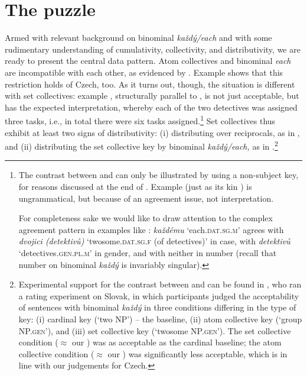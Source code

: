 \documentclass[output=paper,colorlinks,citecolor=brown,newtxmath]{langscibook}
\begin{document}

\section{The puzzle}\label{s:puzzle}

\largerpage
Armed with relevant background on binominal \textit{každý/each} and with some rudimentary understanding of cumulativity, collectivity, and distributivity, we are ready to present the central data pattern. Atom collectives and binominal \textit{each} are incompatible with each other, as evidenced by . Example  shows that this restriction holds of Czech, too. As it turns out, though, the situation is different with set collectives: example , structurally parallel to , is not just acceptable, but has the expected interpretation, whereby each of the two detectives was assigned three tasks, i.e., in total there were six tasks assigned.\footnote{The contrast between  and  can only be illustrated by using a non-subject key, for reasons discussed at the end of . Example  (just as its kin ) is ungrammatical, but because of an agreement issue, not interpretation.

\label{ex:coll.num.subj}
\z

\noindent For completeness sake we would like to draw attention to the complex agreement pattern in examples like : \textit{každému} `each.\textsc{dat.sg.m}' agrees with \textit{dvojici (detektivů)} `twosome.\textsc{dat.sg.f} (of detectives)' in case, with \textit{detektivů} `detectives.\textsc{gen.pl.m}' in gender, and with neither in number (recall that number on binominal \textit{každý} is invariably singular).} Set collectives thus exhibit at least two signs of distributivity: (i) distributing over reciprocals, as in , and (ii) distributing the set collective key by binominal \textit{každý/each,} as in .\footnote{Experimental support for the contrast between  and  can be found in \cite{Kuruncziova2020thesis}, who ran a rating experiment on Slovak, in which participants judged the acceptability of sentences with binominal \textit{každý} in three conditions differing in the type of key: (i) cardinal key (`two NP') -- the baseline, (ii) atom collective key (`group NP.\textsc{gen}'), and (iii) set collective key (`twosome NP.\textsc{gen}'). The set collective condition ($\approx$ our ) was as acceptable as the cardinal baseline; the atom collective condition ($\approx$ our ) was significantly less acceptable, which is in line with our judgements for Czech.}
\end{document}
